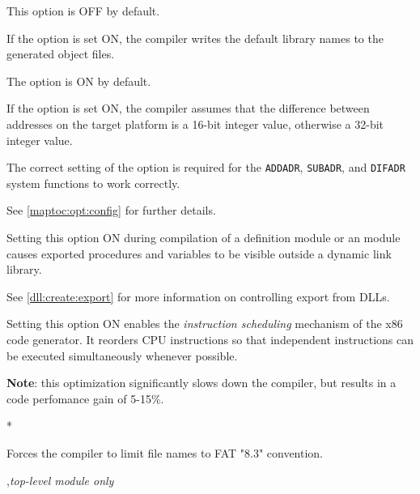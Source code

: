 \begin{description}
        This option is OFF by default.

        \MLBegin{}\ModeC{}\MLEnd{}

        If the option is set ON, the compiler writes the default
        library names to the generated object files.

        The option is ON by default.
\fi

\ifgenc
{}
        \MLBegin{}\ModeC{}\MLEnd{}

        If the option is set ON, the compiler assumes that the
        difference between addresses  on the target  platform is a
        16-bit integer value, otherwise a 32-bit integer value.

        The correct setting of the option is required for
        the \verb'ADDADR', \verb'SUBADR', and \verb'DIFADR'
        system functions to work correctly.

        See \ref{maptoc:opt:config} for further details.
\fi

\ifgencode
\ifdll
{}
        \MLBegin{}\ModeC{}\MLEnd{} \inline

        Setting this option ON during compilation of a \mt{} definition module
        or an \ot{} module causes exported procedures and variables
        to be visible outside a dynamic link library.

        See \ref{dll:create:export} for more information on
        controlling export from DLLs.
\fi

        \MLBegin{}\ModeC{}\MLEnd{} \header

        Setting this option ON enables the {\em instruction scheduling}
        mechanism of the x86 code generator. It reorders CPU instructions
        so that independent instructions can be executed simultaneously
        whenever possible.

        {\bf Note}: this optimization significantly slows down the compiler,
        but results in a code perfomance gain of 5-15\%.
\fi

        \MLBegin{}*\MLEnd{}

        Forces the compiler to limit file names to FAT "8.3" convention.

        \MLBegin{}\ModeC{},{\em top-level module only}\MLEnd{} \header


\end{description}
